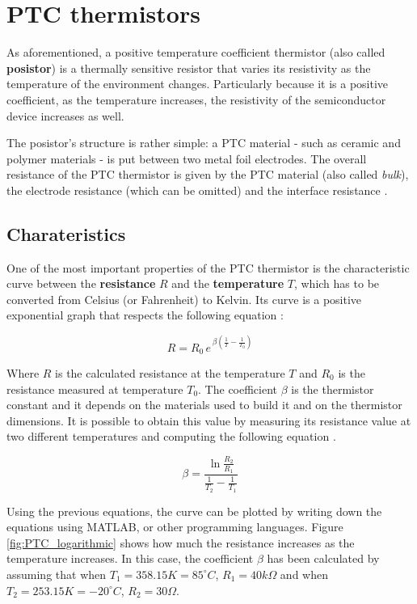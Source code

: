 \vspace{30px}\section{PTC thermistors}
As aforementioned, a positive temperature coefficient thermistor (also called \textbf{posistor}) is a thermally sensitive resistor that varies its resistivity as the temperature of the environment changes. Particularly because it is a positive coefficient, as the temperature increases, the resistivity of the semiconductor device increases as well.

The posistor's structure is rather simple: a PTC material - such as ceramic and polymer materials - is put between two metal foil electrodes. The overall resistance of the PTC thermistor is given by the PTC material (also called \textsl{bulk}), the electrode resistance (which can be omitted) and the interface resistance \cite{Tang2023}. 

\subsection{Charateristics}
One of the most important properties of the PTC thermistor is the characteristic curve between the \textbf{resistance} $R$ and the \textbf{temperature} $T$, which has to be converted from Celsius (or Fahrenheit) to Kelvin. Its curve is a positive exponential graph that respects the following equation \cite{Saburi196353}\cite{jones2010biomedical}:

\begin{equation*}
    R = R_0 \, e^{\, \beta\left( \frac{1}{T} - \frac{1}{T_0}\right)}
\end{equation*}

\noindent Where $R$ is the calculated resistance at the temperature $T$ and $R_0$ is the resistance measured at temperature $T_0$. The coefficient $\beta$ is the thermistor constant and it depends on the materials used to build it and on the thermistor dimensions. It is possible to obtain this value by measuring its resistance value at two different temperatures and computing the following equation \cite{Saburi196353}.

\begin{equation*}
    \beta = \frac{\ln{\frac{R_2}{R_1}}}{\frac{1}{T_2} - \frac{1}{T_1}}
\end{equation*}

\noindent Using the previous equations, the curve can be plotted by writing down the equations using MATLAB, or other programming languages. Figure \ref{fig:PTC_logarithmic} shows how much the resistance increases as the temperature increases. In this case, the coefficient $\beta$ has been calculated by assuming that when $T_1 = 358.15 K = 85^\circ C$, $R_1 = 40k\Omega$ and when $T_2 = 253.15 K = -20^\circ C$, $R_2 = 30\Omega$.

